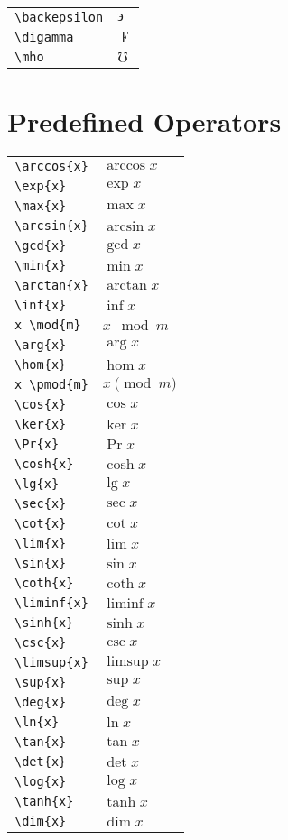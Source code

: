 \documentclass[text,xhtml,itex]{internet}
\begin{document}
\begin{tabular}{ll}
\verb+\backepsilon+ & \(\backepsilon\) \\
\verb+\digamma+ & \(\digamma\) \\
\verb+\mho+ & \(\mho\)
\end{tabular}

\section{Predefined Operators}

\begin{tabular}{ll}
\verb+\arccos{x}+  & \(\arccos{x}\)  &\\
\verb+\exp{x}+    & \(\exp{x}\)     \\
\verb+\max{x}+    & \(\max{x}\)\\
\verb+\arcsin{x}+  & \(\arcsin{x}\)  \\
\verb+\gcd{x}+    & \(\gcd{x}\)     \\
\verb+\min{x}+    & \(\min{x}\)\\
\verb+\arctan{x}+  & \(\arctan{x}\)  \\
\verb+\inf{x}+    & \(\inf{x}\)     \\
\verb+x \mod{m}+  & \(x \mod{m}\)\\
\verb+\arg{x}+     & \(\arg{x}\)     \\
\verb+\hom{x}+    & \(\hom{x}\)     \\
\verb+x \pmod{m}+ & \(x \pmod{m}\)\\
\verb+\cos{x}+     & \(\cos{x}\)     \\
\verb+\ker{x}+    & \(\ker{x}\)     \\
\verb+\Pr{x}+     & \(\Pr{x}\)\\
\verb+\cosh{x}+    & \(\cosh{x}\)    \\
\verb+\lg{x}+     & \(\lg{x}\)      \\
\verb+\sec{x}+    & \(\sec{x}\)\\
\verb+\cot{x}+     & \(\cot{x}\)     \\
\verb+\lim{x}+    & \(\lim{x}\)     \\
\verb+\sin{x}+    & \(\sin{x}\)\\
\verb+\coth{x}+    & \(\coth{x}\)    \\
\verb+\liminf{x}+ & \(\liminf{x}\)  \\
\verb+\sinh{x}+   & \(\sinh{x}\)\\
\verb+\csc{x}+     & \(\csc{x}\)     \\
\verb+\limsup{x}+ & \(\limsup{x}\)  \\
\verb+\sup{x}+    & \(\sup{x}\)\\
\verb+\deg{x}+     & \(\deg{x}\)     \\
\verb+\ln{x}+     & \(\ln{x}\)      \\
\verb+\tan{x}+    & \(\tan{x}\)\\
\verb+\det{x}+     & \(\det{x}\)     \\
\verb+\log{x}+    & \(\log{x}\)     \\
\verb+\tanh{x}+   & \(\tanh{x}\)\\
\verb+\dim{x}+     & \(\dim{x}\)
\end{tabular}
\end{document}

